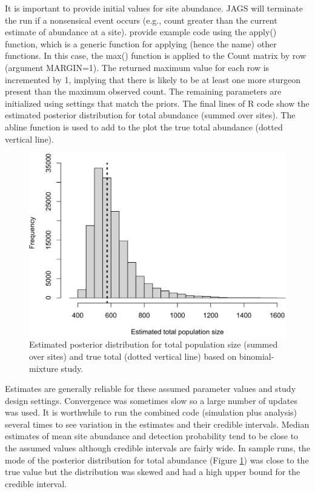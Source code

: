 \documentclass[
]{krantz}
\begin{document}
It is important to provide initial values for site abundance. JAGS will terminate the run if a nonsensical event occurs (e.g., count greater than the current estimate of abundance at a site). \citet{kéry.schaub_2012} provide example code using the apply() function, which is a generic function for applying (hence the name) other functions. In this case, the max() function is applied to the Count matrix by row (argument MARGIN=1). The returned maximum value for each row is incremented by 1, implying that there is likely to be at least one more sturgeon present than the maximum observed count. The remaining parameters are initialized using settings that match the priors. The final lines of R code show the estimated posterior distribution for total abundance (summed over sites). The abline function is used to add to the plot the true total abundance (dotted vertical line).

\begin{figure}
\includegraphics[width=0.9\linewidth]{bookdown_files/figure-latex/NmixPlot-1} \caption{Estimated posterior distribution for total population size (summed over sites) and true total (dotted vertical line) based on binomial-mixture study.}\label{fig:NmixPlot}
\end{figure}

Estimates are generally reliable for these assumed parameter values and study design settings. Convergence was sometimes slow so a large number of updates was used. It is worthwhile to run the combined code (simulation plus analysis) several times to see variation in the estimates and their credible intervals. Median estimates of mean site abundance and detection probability tend to be close to the assumed values although credible intervals are fairly wide. In sample runs, the mode of the posterior distribution for total abundance (Figure \ref{fig:NmixPlot}) was close to the true value but the distribution was skewed and had a high upper bound for the credible interval.
\end{document}
